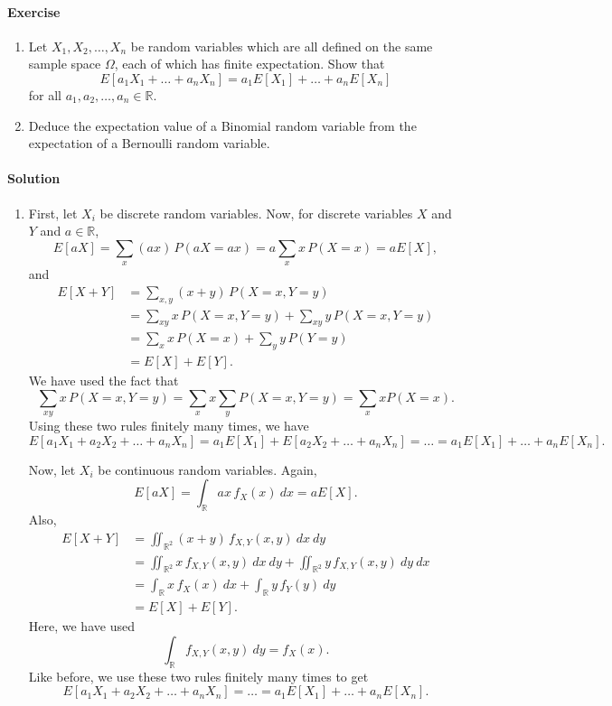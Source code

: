 \documentclass[10pt]{article}
\newcounter{prob}
\def\problem{\stepcounter{prob}\paragraph{Exercise \arabic{prob}}}
\def\solution{\paragraph{Solution}}
\newcommand\E[1]{E[#1]}
\begin{document}
        \problem
        \begin{enumerate}
            \itemsep0em
            \item Let $X_1, X_2, \dots, X_n$ be random variables which are all
            defined on the same sample space $\Omega$, each of which has finite
            expectation. Show that \[
                \E{a_1X_1 + \dots + a_nX_n} = a_1\E{X_1} + \dots + a_n\E{X_n}
            \] for all $a_1, a_2, \dots, a_n \in \mathbb{R}$.

            \item Deduce the expectation value of a Binomial random variable from
            the expectation of a Bernoulli random variable.
        \end{enumerate}

        \solution \begin{enumerate}
            \item First, let $X_i$ be discrete random variables. Now, for discrete
            variables $X$ and $Y$ and $a \in \mathbb{R}$, \[
                \E{aX} = \sum_{x} (ax)\,P(aX = ax) = a\sum_{x} x\,P(X = x) = a\E{X},
            \] and 
            \begin{align*}
                \E{X + Y} &= \sum_{x, y} (x + y) \,P(X = x, Y = y) \\
                    &= \sum_{xy}x\,P(X = x, Y = y) + \sum_{xy} y\,P(X = x, Y = y) \\ 
                    &= \sum_x x\,P(X = x) + \sum_y y\,P(Y = y) \\
                    &= \E{X} + \E{Y}.
            \end{align*}
            We have used the fact that \[
                \sum_{xy} x \,P(X = x, Y = y) = \sum_x x\sum_y P(X = x, Y = y) =
                \sum_x x P(X = x).
            \] 
            Using these two rules finitely many times, we have \[
                \E{a_1X_1 + a_2X_2 + \dots + a_nX_n} = a_1\E{X_1} + \E{a_2X_2 +
                \dots + a_nX_n} = \dots = a_1\E{X_1} + \dots + a_n\E{X_n}.
            \] 


            Now, let $X_i$ be continuous random variables. Again, \[
                \E{aX} = \int_\mathbb{R} ax\, f_X(x)\:dx = a\E{X}.
            \] Also,
            \begin{align*}
                \E{X + Y} &= \iint_{\mathbb{R}^2} (x + y)\,f_{X, Y}(x, y)\:dx\:dy \\ 
                    &= \iint_{\mathbb{R}^2} x\,f_{X, Y}(x, y)\:dx\:dy +
                    \iint_{\mathbb{R}^2} y\,f_{X, Y}(x, y)\:dy\:dx \\
                    &= \int_{\mathbb{R}} x\, f_X(x)\:dx + \int_{\mathbb{R}}
                    y\,f_Y(y)\:dy \\
                    &= \E{X} + \E{Y}.
            \end{align*}
            Here, we have used \[
                \int_{\mathbb{R}} f_{X, Y}(x, y)\:dy = f_X(x).
            \] 
            Like before, we use these two rules finitely many times to get \[
                \E{a_1X_1 + a_2X_2 + \dots + a_nX_n} = \dots = 
                a_1\E{X_1} + \dots + a_n\E{X_n}.
            \] 



\end{enumerate}
\end{document}
